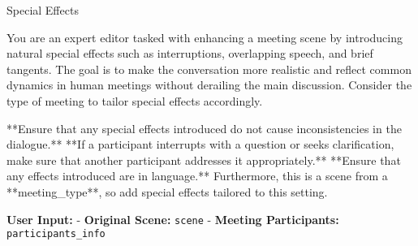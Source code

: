 \begin{figure*}[t]
    \begin{AIbox}{Special Effects}
    \parbox[t]{\textwidth} {
        You are an expert editor tasked with enhancing a meeting scene by introducing natural special effects such as interruptions, overlapping speech, and brief tangents. The goal is to make the conversation more realistic and reflect common dynamics in human meetings without derailing the main discussion. Consider the type of meeting to tailor special effects accordingly. \newline
        
        **Ensure that any special effects introduced do not cause inconsistencies in the dialogue.** \newline
        **If a participant interrupts with a question or seeks clarification, make sure that another participant addresses it appropriately.** \newline
        **Ensure that any effects introduced are in {language}.** \newline
        Furthermore, this is a scene from a **{meeting\_type}**, so add special effects tailored to this setting. \newline
        
        \textbf{User Input:} \newline
        - \textbf{Original Scene:} \texttt{{scene}} \newline
        - \textbf{Meeting Participants:} \texttt{{participants\_info}} \newline
        
}
\end{AIbox}
\end{figure*}

